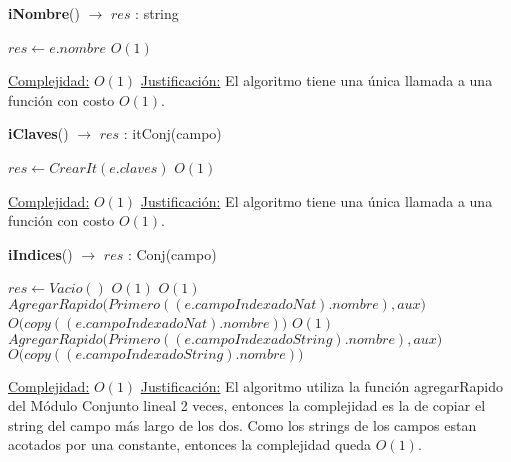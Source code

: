 \begin{Algoritmos}

\medskip
	
  	\medskip
  
\begin{algorithm}[H]{\textbf{iNombre}() $\to$ $res$ : string}
    	\begin{algorithmic}
        \State $res \gets e.nombre$         \Comment $O(1)$

        \medskip
        \Statex \underline{Complejidad:} {$O(1)$}
        \Statex \underline{Justificación:} {El algoritmo tiene una única llamada a una función con costo $O(1)$.}
      \end{algorithmic}
\end{algorithm}

\begin{algorithm}[H]{\textbf{iClaves}() $\to$ $res$ : itConj(campo)}
      \begin{algorithmic}
        \State $res \gets CrearIt(e.claves)$         \Comment $O(1)$

        \medskip
        \Statex \underline{Complejidad:} {$O(1)$}
        \Statex \underline{Justificación:} {El algoritmo tiene una única llamada a una función con costo $O(1)$.}
      \end{algorithmic}
\end{algorithm}

\begin{algorithm}[H]{\textbf{iIndices}() $\to$ $res$ : Conj(campo)}
      \begin{algorithmic}
        \State $res \gets Vacio()$                                  \Comment $O(1)$
                             \Comment $O(1)$
          \State $AgregarRapido\big(Primero((e.campoIndexadoNat).nombre), aux\big)$\\ \Comment $O\big(copy((e.campoIndexadoNat).nombre)\big)$
        \EndIf
                             \Comment $O(1)$
          \State $AgregarRapido\big(Primero((e.campoIndexadoString).nombre), aux\big)$\\ \Comment $O\big(copy((e.campoIndexadoString).nombre)\big)$
        \EndIf

        \medskip
        \Statex \underline{Complejidad:} {$O(1)$}
        \Statex \underline{Justificación:} {El algoritmo utiliza la función agregarRapido del Módulo Conjunto lineal 2 veces, entonces la complejidad es la de copiar el string del campo más largo de los dos. Como los strings de los campos estan acotados por una constante, entonces la complejidad queda $O(1)$.}
      \end{algorithmic}
\end{algorithm}


\end{Algoritmos}
